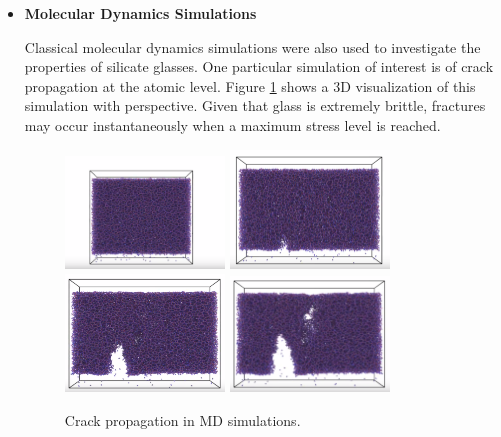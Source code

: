 \begin{itemize}
\item \textbf{Molecular Dynamics Simulations} 

Classical molecular dynamics simulations were also used to investigate the properties of silicate glasses. One particular simulation of interest is of crack propagation at the atomic level. Figure \ref{crack_prop} shows a 3D visualization of this simulation with perspective. Given that glass is extremely brittle, fractures may occur instantaneously when a maximum stress level is reached.
\bigskip
\begin{figure}
    \centering
    \noindent
\includegraphics[width=0.4\textwidth]{picture/frac_prop1.PNG}\hspace{0.2\textwidth}%
\includegraphics[width=0.4\textwidth]{picture/frac_prop2.PNG}\\[2em]
\includegraphics[width=0.4\textwidth]{picture/frac_prop3.PNG}\hspace{0.2\textwidth}%
\includegraphics[width=0.4\textwidth]{picture/frac_prop4.PNG}\par
    \caption{Crack propagation in MD simulations.}
    \label{crack_prop}
\end{figure}


\end{itemize}

